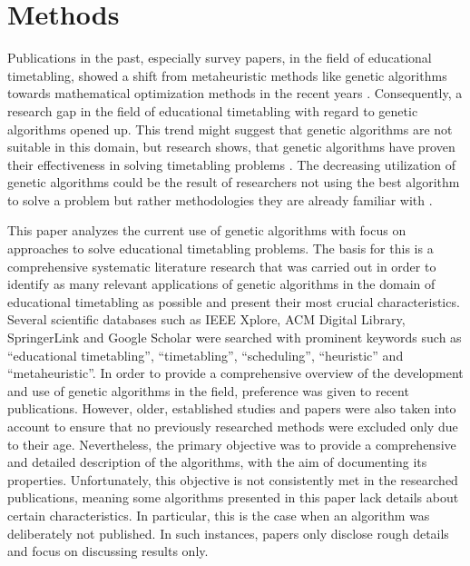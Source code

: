\documentclass[sigconf]{acmart}
\begin{document}
\section{Methods}
Publications in the past, especially survey papers, in the field of educational
timetabling, showed a shift from metaheuristic methods like genetic algorithms
towards mathematical optimization methods in the recent years
\cite{Tan2021}.
%
Consequently, a research gap in the field of educational timetabling
with regard to genetic algorithms opened up.
%
This trend might suggest that genetic algorithms are not suitable in this
domain, but research shows, that genetic algorithms have proven their
effectiveness in solving timetabling problems \cite{Rezaeipanah2019,Chen2021}.
%
The decreasing utilization of genetic algorithms could be the result of
researchers not using the best algorithm to solve a problem but rather
methodologies they are already familiar with \cite{Ceschia2023}.

This paper analyzes the current use of genetic algorithms with focus on
approaches to solve educational timetabling problems.
%
The basis for this is a comprehensive systematic literature research that
was carried out in order to identify as many relevant applications of genetic
algorithms in the domain of educational timetabling as possible and
present their most crucial characteristics.
%
Several scientific databases such as IEEE Xplore, ACM Digital Library,
SpringerLink and Google Scholar were searched with prominent keywords such as
\enquote{educational timetabling}, \enquote{timetabling}, \enquote{scheduling},
\enquote{heuristic} and \enquote{metaheuristic}.
%
In order to provide a comprehensive overview of the development and use of
genetic algorithms in the field, preference was given to recent publications.
However, older, established studies and papers were also taken into account
to ensure that no previously researched methods were excluded only due to their
age.
%
Nevertheless, the primary objective was to provide a comprehensive and detailed
description of the algorithms, with the aim of documenting its properties.
Unfortunately, this objective is not consistently met in the researched
publications, meaning some algorithms presented in this paper lack details
about certain characteristics.
In particular, this is the case when an algorithm was deliberately not
published. In such instances, papers only disclose rough details and focus on
discussing results only.
\end{document}
